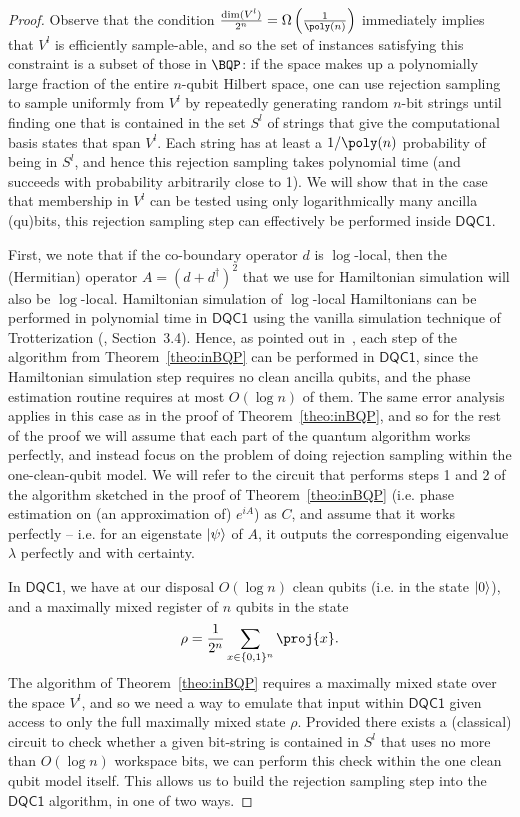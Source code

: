 \documentclass[11pt]{article}
\numberwithin{equation}{section}
\newcommand{\DQC}{\mathsf{DQC1}}
\renewcommand\( {\left(}
\renewcommand\) {\right)}
\begin{document}
\begin{proof}
	Observe that the condition $\frac{\dim(V^l)}{2^n} = \Omega\left(\frac{1}{\poly(n)}\right)$ immediately implies that $V^l$ is efficiently sample-able, and so the set of instances satisfying this constraint is a subset of those in $\BQP$: if the space makes up a polynomially large fraction of the entire $n$-qubit Hilbert space, one can use rejection sampling to sample uniformly from $V^l$ by repeatedly generating random $n$-bit strings until finding one that is contained in the set $S^l$ of strings that give the computational basis states that span $V^l$. Each string has at least a $1/\poly(n)$ probability of being in $S^l$, and hence this rejection sampling takes polynomial time (and succeeds with probability arbitrarily close to 1). We will show that in the case that membership in $V^l$ can be tested using only logarithmically many ancilla (qu)bits, this rejection sampling step can effectively be performed inside $\DQC$.
	
	First, we note that if the co-boundary operator $d$ is $\log$-local, then the (Hermitian) operator $A = (d + d^\dagger)^2$ that we use for Hamiltonian simulation will also be $\log$-local. Hamiltonian simulation of $\log$-local Hamiltonians can be performed in polynomial time in $\DQC$ using the vanilla simulation technique of Trotterization (\cite{cade2018quantum}, Section~3.4). Hence, as pointed out in~\cite{gyurik}, each step of the algorithm from Theorem~\ref{theo:inBQP} can be performed in $\DQC$, since the Hamiltonian simulation step requires no clean ancilla qubits, and the phase estimation routine requires at most $O(\log n)$ of them. The same error analysis applies in this case as in the proof of Theorem~\ref{theo:inBQP}, and so for the rest of the proof we will assume that each part of the quantum algorithm works perfectly, and instead focus on the problem of doing rejection sampling within the one-clean-qubit model. We will refer to the circuit that performs steps 1 and 2 of the algorithm sketched in the proof of Theorem~\ref{theo:inBQP} (i.e. phase estimation on (an approximation of) $e^{iA}$) as $C$, and assume that it works perfectly -- i.e. for an eigenstate $\ket{\psi}$ of $A$, it outputs the corresponding eigenvalue $\lambda$ perfectly and with certainty.  
	
In $\DQC$, we have at our disposal $O(\log n)$ clean qubits (i.e. in the state $\ket{0}$), and a maximally mixed register of $n$ qubits in the state 
	\[
		\rho = \frac{1}{2^n} \sum_{x \in \{0,1\}^n} \proj{x}.
	\]
	The algorithm of Theorem~\ref{theo:inBQP} requires a maximally mixed state over the space $V^l$, and so we need a way to emulate that input within $\DQC$ given access to only the full maximally mixed state $\rho$. Provided there exists a (classical) circuit to check whether a given bit-string is contained in $S^l$ that uses no more than $O(\log n)$ workspace bits, we can perform this check within the one clean qubit model itself. This allows us to build the rejection sampling step into the $\DQC$ algorithm, in one of two ways.


\end{proof}
\end{document}
